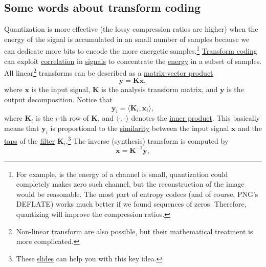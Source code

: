 \subsection{Some words about transform coding}
Quantization is more effective (the lossy compression ratios are
higher) when the energy of the signal is accumulated in an small
number of samples because we can dedicate more bits to encode the more
energetic samples.\footnote{For example, is the energy of a channel is
small, quantization could completely makes zero such channel, but the
reconstruction of the image would be reasonable. The most part of
entropy codecs (and of course, PNG's DEFLATE) works much better if we
found sequences of zeros. Therefore, quantizing will improve the
compression ratios.}
\href{https://web.stanford.edu/class/ee398a/handouts/lectures/07-TransformCoding.pdf}{Transform
  coding} can exploit
\href{https://en.wikipedia.org/wiki/Correlation_and_dependence}{correlation}
in \href{https://en.wikipedia.org/wiki/Signal}{signals} to concentrate
the
\href{https://en.wikipedia.org/wiki/Energy_(signal_processing)}{energy}
in a subset of samples.  All linear\footnote{Non-linear transform are
also possible, but their mathematical treatment is more complicated.}
transforms can be described as a
\href{https://en.wikipedia.org/wiki/Matrix_multiplication}{matrix-vector
  product}~\cite{strang4linear}
\begin{equation}
  \mathbf{y} = \mathbf{K}\mathbf{x},
  \label{eq:forward_transform_matrix_form}
\end{equation}
where $\mathbf{x}$ is the input signal, $\mathbf{K}$ is the analysis
transform matrix, and $\mathbf{y}$ is the output decomposition. Notice
that
\begin{equation}
  {\mathbf{y}}_i = \langle {\mathbf{K}}_i, {\mathbf{x}}_i\rangle,
\end{equation}
where ${\mathbf{K}}_i$ is the $i$-th row of $\mathbf{K}$, and
$\langle\cdot,\cdot\rangle$ denotes the
\href{https://mathworld.wolfram.com/InnerProduct.html}{inner
  product}. This basically means that ${\mathbf{y}}_i$ is proportional to the
\href{https://en.wikipedia.org/wiki/Similarity_(geometry)}{similarity}
between the input signal $\mathbf{x}$ and the
\href{https://en.wikipedia.org/wiki/Finite_impulse_response}{taps} of
the \href{https://en.wikipedia.org/wiki/Digital_filter}{filter}
${\mathbf{K}}_i$.\footnote{These
\href{https://cseweb.ucsd.edu/classes/fa17/cse166-a/lec13.pdf}{slides}
can help you with this key idea.} The inverse (synthesis) transform is
computed by
\begin{equation}
  \mathbf{x} = {\mathbf{K}}^{-1}\mathbf{y},
  \label{eq:backward_transform_matrix_form}
\end{equation}
